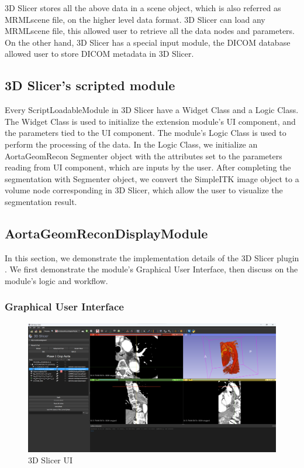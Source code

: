 3D Slicer stores all the above data in a scene object, which is also referred as MRMLscene file, on the higher level data format. 3D Slicer can load any MRMLscene file, this allowed user to retrieve all the data nodes and parameters. On the other hand, 3D Slicer has a special input module, the DICOM database allowed user to store DICOM metadata in 3D Slicer.

\subsection{3D Slicer's scripted module}

Every ScriptLoadableModule in 3D Slicer have a Widget Class and a Logic Class. The Widget Class is used to initialize the extension module's UI component, and the parameters tied to the UI component. The module's Logic Class is used to perform the processing of the data. In the Logic Class, we initialize an AortaGeomRecon Segmenter object with the attributes set to the parameters reading from UI component, which are inputs by the user. After completing the segmentation with Segmenter object, we convert the SimpleITK image object to a volume node corresponding in 3D Slicer, which allow the user to visualize the segmentation result. 

\subsection{AortaGeomReconDisplayModule}

In this section, we demonstrate the implementation details of the 3D Slicer plugin \progname{}. We first demonstrate the module's Graphical User Interface, then discuss on the module's logic and workflow.

\subsubsection{Graphical User Interface}

\begin{figure}[H]
    \centering
    \includegraphics[width=\textwidth]{figures/AGR/Slicer_UI.png}
    \caption[3D Slicer UI]{3D Slicer UI}
    \label{fig_slicer_ui}
\end{figure}

